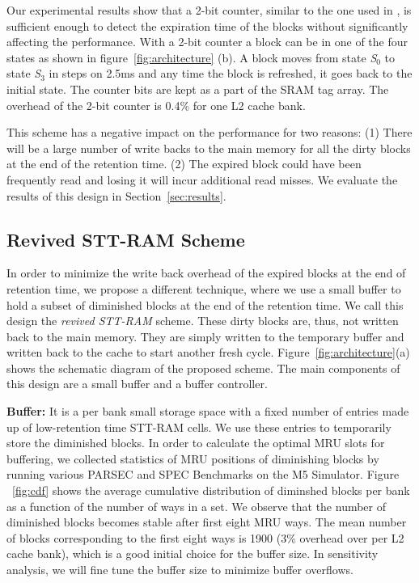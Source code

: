Our experimental results show that a 2-bit counter, similar to the one used in \cite{cache-decay-2001},
is sufficient enough to detect the expiration time of the blocks without significantly affecting the performance.
With a 2-bit counter a block can be in one of the four states as shown in figure~\ref{fig:architecture} (b).
A block moves from state {\it S$_0$} to state {\it S$_3$} in steps on 2.5ms and any time the block is refreshed, it
goes back to the initial state.  The counter bits are kept as a part of the SRAM tag array.
The overhead of the 2-bit counter is 0.4\% for one L2 cache bank.

This scheme has a negative impact on the performance for two reasons: (1) There will be  a large number of write
backs to the main memory for all the dirty blocks at the end of the retention time.
(2) The expired block could have been frequently read and losing it will incur additional read misses.
We evaluate the results of this design in Section~\ref{sec:results}.


\subsection{{Revived STT-RAM Scheme}}
In order to minimize the write back overhead of the expired blocks at the end of retention time, we propose
a different technique, where we use a small buffer to hold a subset of diminished blocks at the end of the retention
time. We call this design the {\it revived STT-RAM} scheme. These dirty blocks are, thus, not written back to the main memory. They are simply written to the temporary buffer and
written back to the cache to start another fresh cycle.
Figure~\ref{fig:architecture}(a) shows the schematic diagram of the proposed scheme.
The main components of this design are a small buffer and a buffer controller.

\noindent\textbf{Buffer:}
It is a per bank small storage space with a fixed number of entries made up of low-retention time STT-RAM cells.
We use these entries to temporarily store the diminished blocks. In order to calculate the optimal MRU slots for buffering, 
we collected statistics of MRU positions of diminishing blocks by running various PARSEC and SPEC Benchmarks on the M5 Simulator.
Figure ~\ref{fig:cdf} shows the average cumulative distribution of diminshed blocks per bank
as a function of the number of ways in a set. We observe that the number of diminished blocks becomes stable
after first eight MRU ways. The mean number of blocks corresponding to the first eight ways is 1900
(3\% overhead over per L2 cache bank),
which is a good initial choice for the buffer size. In sensitivity analysis, we will fine tune the buffer size
to minimize buffer overflows.

